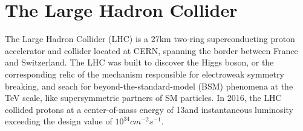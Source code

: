 \chapter{The Large Hadron Collider}
\label{ch:lhc}
The Large Hadron Collider (LHC) is a 27\unit{km} two-ring superconducting
proton accelerator and collider located at CERN, spanning the border between
France and Switzerland. The LHC was built to discover the Higgs boson,
or the corresponding relic of the mechanism responsible for electroweak symmetry
breaking, and seach for beyond-the-standard-model (BSM) phenomena at
the TeV scale, like supersymmetric partners of SM particles. In 2016, the LHC
collided protons at a center-of-mass energy of 13\TeV and
instantaneous luminosity exceeding the design value of $10^{34} \unit{cm}^{-2} \unit{s}^{-1}$.
\begin{table}
\centering
 \caption{Comparison between LHC design parameters and achieved
   parameters in 2012, 2015, and 2016.
 \label{tab:LHCparameters}}
\end{table}
